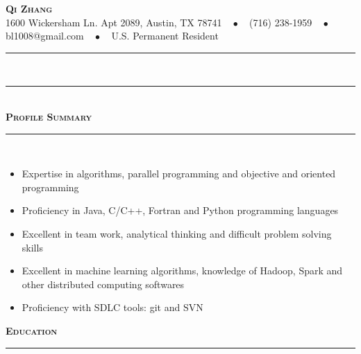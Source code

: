 \documentclass[11pt]{article}
\begin{document}
\begin{center}
{\Huge\textbf{\textsc{{Qi Zhang}}}} \\[5pt]
1600 Wickersham Ln. Apt 2089, Austin, TX 78741 $\text{ }\bullet\text{ }$ (716) 238-1959 $\text{ }\bullet\text{ }$  bl1008@gmail.com $\text{ }\bullet\text{ }$ U.S. Permanent Resident 
\end{center}
 \rule[0.8em]{\textwidth}{0.5pt} \\[-11pt]
 \rule[0.8em]{\textwidth}{0.5pt} \\[0pt]
\textbf{\textsc{\LARGE{Profile Summary}}} \\ \rule[0.8em]{\textwidth}{0.5pt} \\[-20pt]
\begin{itemize}[topsep=0pt,partopsep=0pt,leftmargin=16pt]
\item Expertise in algorithms, parallel programming and objective and oriented programming
\item Proficiency in Java, C/C++, Fortran and Python programming languages
\item Excellent in team work, analytical thinking and difficult problem solving skills
\item Excellent in machine learning algorithms, knowledge of Hadoop, Spark and other distributed computing softwares
\item Proficiency with SDLC tools: git and SVN
\end{itemize}
\vspace{4pt}

\textbf{\textsc{\LARGE{Education}}} \\ \rule[0.8em]{\textwidth}{0.5pt} \\[-16pt]
\end{document}
